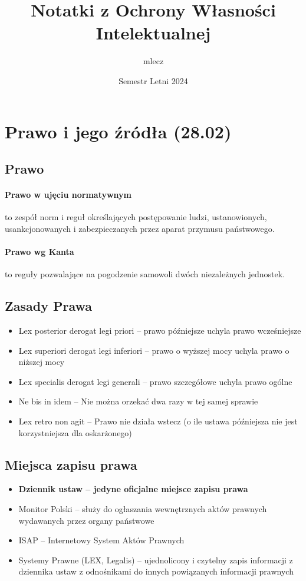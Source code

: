 \documentclass{article}
\title{Notatki z Ochrony Własności Intelektualnej}
\author{mlecz}
\date{Semestr Letni 2024}
\begin{document}
\maketitle

\tableofcontents

\section{Prawo i jego źródła (28.02)}

\subsection{Prawo}

\paragraph{Prawo w ujęciu normatywnym}
to zespół norm i reguł określających postępowanie ludzi, ustanowionych, usankcjonowanych i zabezpieczanych przez aparat przymusu państwowego.

\paragraph{Prawo wg Kanta}
to reguły pozwalające na pogodzenie samowoli dwóch niezależnych jednostek.

\subsection{Zasady Prawa}
\begin{itemize}
  \item Lex posterior derogat legi priori -- prawo późniejsze uchyla prawo wcześniejsze
  \item Lex superiori derogat legi inferiori -- prawo o wyższej mocy uchyla prawo o niższej mocy
  \item Lex specialis derogat legi generali -- prawo szczegółowe uchyla prawo ogólne
  \item Ne bis in idem -- Nie można orzekać dwa razy w tej samej sprawie
  \item Lex retro non agit -- Prawo nie działa wstecz (o ile ustawa późniejsza nie jest
        korzystniejsza dla oskarżonego)
\end{itemize}

\subsection{Miejsca zapisu prawa}
\begin{itemize}
  \item \textbf{Dziennik ustaw -- jedyne oficjalne miejsce zapisu prawa}
  \item Monitor Polski -- służy do ogłaszania wewnętrznych aktów prawnych wydawanych
        przez organy państwowe
  \item ISAP -- Internetowy System Aktów Prawnych
  \item Systemy Prawne (LEX, Legalis) -- ujednolicony i czytelny zapis informacji
        z dziennika ustaw z odnośnikami do innych powiązanych informacji prawnych
\end{itemize}
\end{document}
